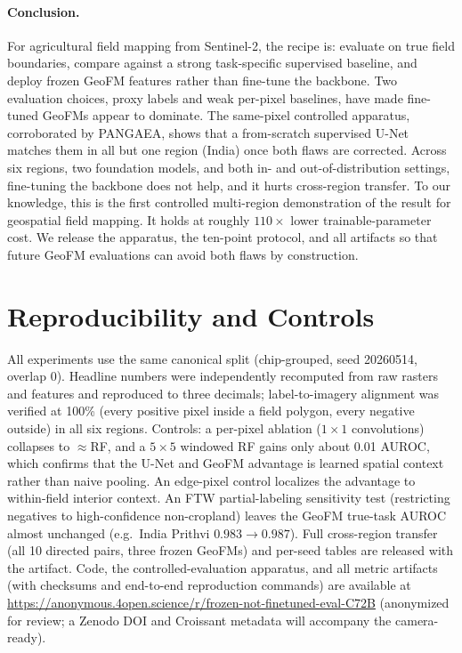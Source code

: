 \documentclass{article}
\begin{document}
\paragraph{Conclusion.} For agricultural field mapping from Sentinel-2, the
recipe is: evaluate on true field boundaries, compare against a strong task-specific
supervised baseline, and deploy frozen GeoFM features rather than fine-tune the
backbone. Two evaluation choices, proxy labels and weak per-pixel baselines, have
made fine-tuned GeoFMs appear to dominate. The same-pixel controlled apparatus,
corroborated by PANGAEA, shows that a from-scratch supervised U-Net matches them in
all but one region (India) once both flaws are corrected. Across six regions, two foundation models, and both
in- and out-of-distribution settings, fine-tuning the backbone does not help, and
it hurts cross-region transfer. To our knowledge, this is the first controlled
multi-region demonstration of the result for geospatial field mapping. It holds
at roughly $110\times$ lower trainable-parameter cost. We release the apparatus, the ten-point protocol, and all
artifacts so that future GeoFM evaluations can avoid both flaws by construction.




\appendix
\section{Reproducibility and Controls}
\label{app:repro}
All experiments use the same canonical split (chip-grouped, seed 20260514, overlap
0). Headline numbers were independently recomputed from raw rasters and features
and reproduced to three decimals; label-to-imagery alignment was verified at 100\%
(every positive pixel inside a field polygon, every negative outside) in all six
regions. Controls: a per-pixel ablation ($1\times1$ convolutions) collapses to
$\approx$RF, and a $5\times5$ windowed RF gains only about 0.01 AUROC, which
confirms that the U-Net and GeoFM advantage is learned spatial context rather than
naive pooling. An edge-pixel control localizes the advantage to within-field
interior context. An FTW partial-labeling sensitivity test (restricting negatives
to high-confidence non-cropland) leaves the GeoFM true-task AUROC almost
unchanged (e.g.\ India Prithvi $0.983 \to 0.987$). Full cross-region transfer (all
10 directed pairs, three frozen GeoFMs) and per-seed tables are released with the
artifact. Code, the controlled-evaluation apparatus, and all metric artifacts (with
checksums and end-to-end reproduction commands) are available at
\url{https://anonymous.4open.science/r/frozen-not-finetuned-eval-C72B} (anonymized for
review; a Zenodo DOI and Croissant metadata will accompany the camera-ready).
\end{document}
